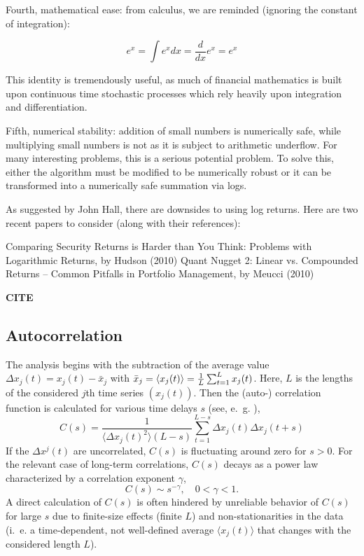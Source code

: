 \documentclass[a4paper,10pt]{scrbook}
\begin{document}
Fourth, mathematical ease: from calculus, we are reminded (ignoring the constant of integration):

\begin{equation}
    e^x = \int e^x dx = \frac{d}{dx} e^x = e^x 
\end{equation}

This identity is tremendously useful, as much of financial mathematics is built upon continuous time stochastic processes which rely heavily upon integration and differentiation.

Fifth, numerical stability: addition of small numbers is numerically safe, while multiplying small numbers is not as it is subject to arithmetic underflow. For many interesting problems, this is a serious potential problem. To solve this, either the algorithm must be modified to be numerically robust or it can be transformed into a numerically safe summation via logs.

As suggested by John Hall, there are downsides to using log returns. Here are two recent papers to consider (along with their references):

Comparing Security Returns is Harder than You Think: Problems with Logarithmic Returns, by Hudson (2010)
Quant Nugget 2: Linear vs. Compounded Returns – Common Pitfalls in Portfolio Management, by Meucci (2010)

\textbf{CITE}

\subsection{Autocorrelation}

The analysis begins with the subtraction of the average value $\Delta x_j(t) = x_j(t) - \bar x_j$ with 
$\bar x_j = \langle x_j(t) \rangle = {1 \over L} \sum_{t=1}^L x_j(t)$.  Here, $L$ is the lengths of the 
considered $j$th time series $(x_j(t))$.  Then the (auto-) correlation function is calculated for various 
time delays $s$ (see, e.~g. \cite{Kantelhardt.2009}),
\begin{equation}
 C(s) = {\frac{ 1 }{ \langle \Delta x_j(t)^2 \rangle (L-s)}} \sum_{t=1}^{L-s} \Delta x_j(t) \Delta x_j(t+s)
\end{equation} 
If the $\Delta x^j(t)$ are uncorrelated, $C(s)$ is fluctuating around zero for $s>0$. For the relevant 
case of long-term correlations, $C(s)$ decays as a power law characterized by a correlation exponent $\gamma$,
%
\begin{equation}
C(s) \sim s^{-\gamma}, \quad 0<\gamma<1.  \label{gamma}
\end{equation}
%
A direct calculation of $C(s)$ is often hindered by unreliable behavior of $C(s)$ for large $s$ due to finite-size 
effects (finite $L$) and non-stationarities in the data (i.~e. a time-dependent, not well-defined average $\langle 
x_j(t) \rangle$ that changes with the considered length $L$).
\end{document}
